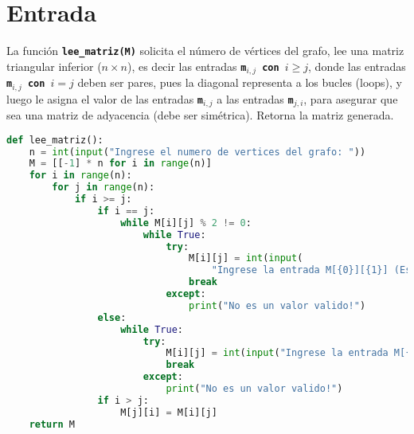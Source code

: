 \section{Entrada}
La función \texttt{\textbf{lee\_matriz(M)}} solicita el número de vértices del grafo, lee una matriz triangular inferior ($n\times n$), es decir las entradas \texttt{\textbf{m$_{i,j}$ con $i\ge j$}}, donde las  entradas \texttt{\textbf{m$_{i,j}$ con $i=j$}} deben ser pares, pues la diagonal representa a los bucles (loops), y luego le asigna el valor de las entradas \texttt{\textbf{m$_{i,j}$}} a las entradas \texttt{\textbf{m$_{j,i}$}}, para asegurar que sea una matriz de adyacencia (debe ser simétrica). Retorna la matriz generada.
\begin{lstlisting}[language=python, caption=Función lee\_matriz()]
def lee_matriz():
    n = int(input("Ingrese el numero de vertices del grafo: "))
    M = [[-1] * n for i in range(n)]
    for i in range(n):
        for j in range(n):
            if i >= j:
                if i == j:
                    while M[i][j] % 2 != 0:
                        while True:
                            try:
                                M[i][j] = int(input(
                                    "Ingrese la entrada M[{0}][{1}] (Esta debe ser par): ".format(str(i + 1), str(j + 1))))
                                break
                            except:
                                print("No es un valor valido!")
                else:
                    while True:
                        try:
                            M[i][j] = int(input("Ingrese la entrada M[{0}][{1}]: ".format(str(i + 1), str(j + 1))))
                            break
                        except:
                            print("No es un valor valido!")
                if i > j:
                    M[j][i] = M[i][j]
    return M
\end{lstlisting}